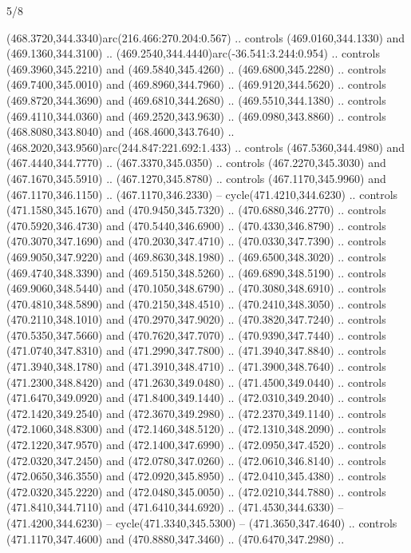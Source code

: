 \begin{flagdescription}{5/8}
\begin{scope}[xshift=0.5\flaglength,yshift=0.5\flagwidth,scale=\flagwidth/475.63]
\begin{scope}[y=0.8pt, x=0.8pt, yscale=-1, xscale=1,shift={(-450,-300)}]
\begin{scope}[cm={{1.0,0.0,0.0,1.0,(-0.0002,0.12556)}},cm={{1.0,0.0,0.0,1.0,(0.00179,0.0)}}]
\begin{scope}[cm={{1.01375,0.0,0.0,1.01375,(-5.36379,-4.94943)}}]
  (468.3720,344.3340)arc(216.466:270.204:0.567) .. controls (469.0160,344.1330)
  and (469.1360,344.3100) .. (469.2540,344.4440)arc(-36.541:3.244:0.954) ..
  controls (469.3960,345.2210) and (469.5840,345.4260) .. (469.6800,345.2280) ..
  controls (469.7400,345.0010) and (469.8960,344.7960) .. (469.9120,344.5620) ..
  controls (469.8720,344.3690) and (469.6810,344.2680) .. (469.5510,344.1380) ..
  controls (469.4110,344.0360) and (469.2520,343.9630) .. (469.0980,343.8860) ..
  controls (468.8080,343.8040) and (468.4600,343.7640) ..
  (468.2020,343.9560)arc(244.847:221.692:1.433) .. controls (467.5360,344.4980)
  and (467.4440,344.7770) .. (467.3370,345.0350) .. controls (467.2270,345.3030)
  and (467.1670,345.5910) .. (467.1270,345.8780) .. controls (467.1170,345.9960)
  and (467.1170,346.1150) .. (467.1170,346.2330) -- cycle(471.4210,344.6230) ..
  controls (471.1580,345.1670) and (470.9450,345.7320) .. (470.6880,346.2770) ..
  controls (470.5920,346.4730) and (470.5440,346.6900) .. (470.4330,346.8790) ..
  controls (470.3070,347.1690) and (470.2030,347.4710) .. (470.0330,347.7390) ..
  controls (469.9050,347.9220) and (469.8630,348.1980) .. (469.6500,348.3020) ..
  controls (469.4740,348.3390) and (469.5150,348.5260) .. (469.6890,348.5190) ..
  controls (469.9060,348.5440) and (470.1050,348.6790) .. (470.3080,348.6910) ..
  controls (470.4810,348.5890) and (470.2150,348.4510) .. (470.2410,348.3050) ..
  controls (470.2110,348.1010) and (470.2970,347.9020) .. (470.3820,347.7240) ..
  controls (470.5350,347.5660) and (470.7620,347.7070) .. (470.9390,347.7440) ..
  controls (471.0740,347.8310) and (471.2990,347.7800) .. (471.3940,347.8840) ..
  controls (471.3940,348.1780) and (471.3910,348.4710) .. (471.3900,348.7640) ..
  controls (471.2300,348.8420) and (471.2630,349.0480) .. (471.4500,349.0440) ..
  controls (471.6470,349.0920) and (471.8400,349.1440) .. (472.0310,349.2040) ..
  controls (472.1420,349.2540) and (472.3670,349.2980) .. (472.2370,349.1140) ..
  controls (472.1060,348.8300) and (472.1460,348.5120) .. (472.1310,348.2090) ..
  controls (472.1220,347.9570) and (472.1400,347.6990) .. (472.0950,347.4520) ..
  controls (472.0320,347.2450) and (472.0780,347.0260) .. (472.0610,346.8140) ..
  controls (472.0650,346.3550) and (472.0920,345.8950) .. (472.0410,345.4380) ..
  controls (472.0320,345.2220) and (472.0480,345.0050) .. (472.0210,344.7880) ..
  controls (471.8410,344.7110) and (471.6410,344.6920) .. (471.4530,344.6330) --
  (471.4200,344.6230) -- cycle(471.3340,345.5300) -- (471.3650,347.4640) ..
  controls (471.1170,347.4600) and (470.8880,347.3460) .. (470.6470,347.2980) ..

\end{scope}
\end{scope}
\end{scope}
\end{scope}
\end{flagdescription}
